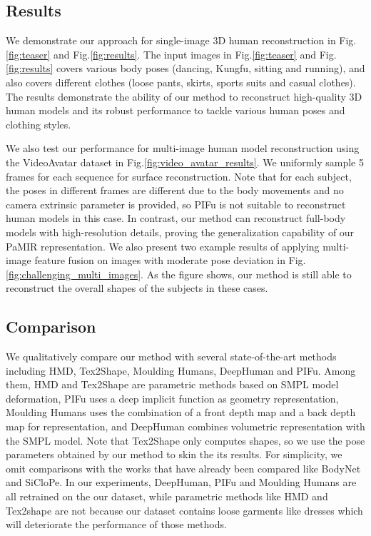 \subsection{Results}
\label{sec:results:results}

We demonstrate our approach for single-image 3D human reconstruction in Fig.\ref{fig:teaser} and Fig.\ref{fig:results}. The input images in Fig.\ref{fig:teaser} and Fig.\ref{fig:results} covers various body poses (dancing, Kungfu, sitting and running), and also covers different clothes (loose pants, skirts, sports suits and casual clothes). The results demonstrate the ability of our method to reconstruct high-quality 3D human models and its robust performance to tackle various human poses and clothing styles. 

We also test our performance for multi-image human model reconstruction using the VideoAvatar dataset in Fig.\ref{fig:video_avatar_results}. We uniformly sample 5 frames for each sequence for surface reconstruction. Note that for each subject, the poses in different frames are different due to the body movements and no camera extrinsic parameter is provided, so PIFu is not suitable to reconstruct human models in this case. In contrast, our method can reconstruct full-body models with high-resolution details, proving the generalization capability of our PaMIR representation. 
We also present two example results of applying multi-image feature fusion on images with moderate pose deviation in Fig.\ref{fig:challenging_multi_images}. As the figure shows, our method is still able to reconstruct the overall shapes of the subjects in these cases.



\subsection{Comparison}
\label{sec:results:comparison}

We qualitatively compare our method with several state-of-the-art methods including HMD\cite{HMD2019}, Tex2Shape\cite{tex2shape2019}, Moulding Humans\cite{MouldingHumans2019}, DeepHuman\cite{Zheng2019DeepHuman} and PIFu\cite{pifuSHNMKL19}. Among them, HMD\cite{HMD2019} and Tex2Shape\cite{tex2shape2019} are parametric methods based on SMPL\cite{SMPL:2015} model deformation, PIFu\cite{pifuSHNMKL19} uses a deep implicit function as geometry representation, Moulding Humans\cite{MouldingHumans2019} uses the combination of a front depth map and a back depth map for representation, and DeepHuman\cite{Zheng2019DeepHuman} combines volumetric representation with the SMPL model. Note that Tex2Shape only computes shapes, so we use the pose parameters obtained by our method to skin the its results. 
For simplicity, we omit comparisons with the works that have already been compared like BodyNet\cite{BodyNet} and SiCloPe\cite{SiCloPe2019}.
In our experiments, DeepHuman, PIFu and Moulding Humans are all retrained on the our dataset, while parametric methods like HMD and Tex2shape are not because our dataset contains loose garments like dresses which will deteriorate the performance of those methods. 





